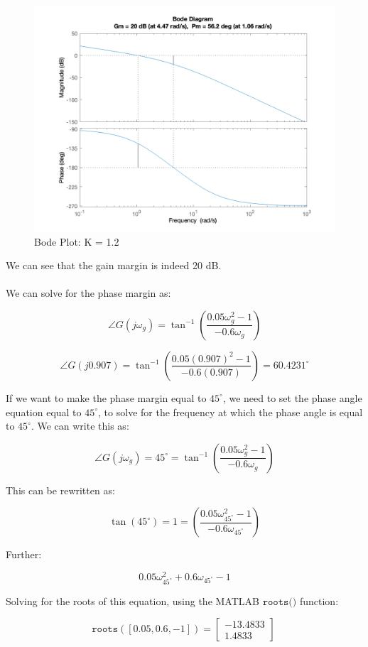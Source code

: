 \documentclass[12pt, letterpaper]{../assignment}
\begin{document}
\begin{figure}[H]
    \centering
    \includegraphics[width=1\linewidth]{./figures/BodePlot_K_1.2.png}
    \caption{Bode Plot: K = 1.2}
 \end{figure}

We can see that the gain margin is indeed 20 dB. 
\\\\
We can solve for the phase margin as:

$$ \angle G(j\omega_g) = \tan^{-1} \left( \frac{0.05\omega_g ^2 - 1}{- 0.6 \omega_g} \right) $$

$$ \angle G(j0.907) = \tan^{-1} \left( \frac{0.05(0.907) ^2 - 1}{- 0.6 (0.907)} \right) = 60.4231^\circ $$

If we want to make the phase margin equal to $45^\circ$,
we need to set the phase angle equation equal to $45^\circ$, to solve for the frequency at which the phase angle is equal to $45^\circ$.
We can write this as:

$$ \angle G(j\omega_g) = 45^\circ = \tan^{-1} \left( \frac{0.05\omega_g ^2 - 1}{- 0.6 \omega_g} \right) $$

This can be rewritten as:

$$ \tan(45^\circ) = 1 =\left( \frac{0.05\omega_{45^\circ} ^2 - 1}{- 0.6 \omega_{45^\circ}} \right) $$

Further:

$$ 0.05\omega_{45^\circ} ^2 + 0.6 \omega_{45^\circ} - 1 $$

Solving for the roots of this equation, using the MATLAB $\texttt{roots()}$ function:

$$ \texttt{roots}([0.05,0.6,-1]) = \left[\begin{array}{r} 
    -13.4833\\
    \mathbf{1.4833}
    \end{array} \right]\ $$
\end{document}
